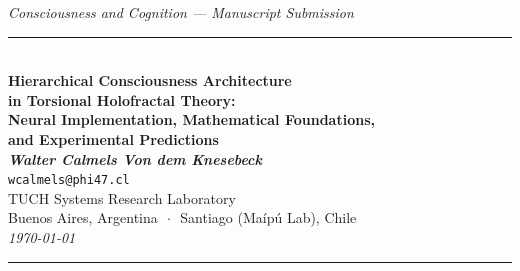 \documentclass[12pt,a4paper]{article}
\numberwithin{equation}{section}
\begin{document}
\begin{center}
  {\small\textit{Consciousness and Cognition --- Manuscript Submission}}\\[4pt]
  \rule{\textwidth}{1.2pt}\\[10pt]
  {\LARGE\bfseries\color{darkgreen}
    Hierarchical Consciousness Architecture\\[4pt]
    in Torsional Holofractal Theory:\\[4pt]
    Neural Implementation, Mathematical Foundations,\\[4pt]
    and Experimental Predictions
  }\\[12pt]
  {\large\bfseries\itshape Walter Calmels Von dem Knesebeck}\\[4pt]
  {\normalsize\texttt{wcalmels@phi47.cl}}\\[4pt]
  {\normalsize TUCH Systems Research Laboratory}\\
  {\normalsize Buenos Aires, Argentina $\,\cdot\,$ Santiago (Ma\'ip\'u Lab), Chile}\\[6pt]
  {\normalsize\textit{\today}}\\[10pt]
  \rule{\textwidth}{1.2pt}
\end{center}
\end{document}

